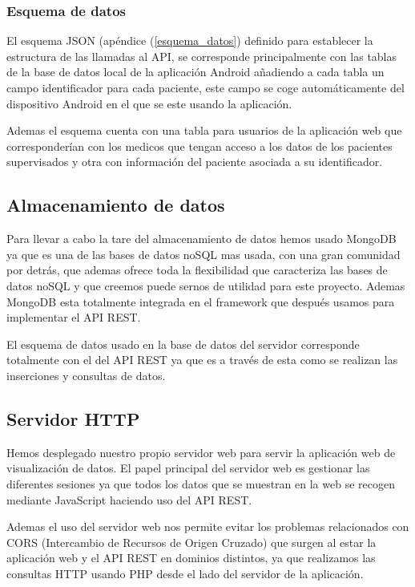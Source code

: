 \subsubsection{Esquema de datos}

El esquema JSON (apéndice (\ref{esquema_datos}) definido para establecer la estructura de las llamadas al API, se corresponde principalmente con las tablas de la base de datos local de la aplicación Android añadiendo a cada tabla un campo identificador para cada paciente, este campo se coge automáticamente del dispositivo Android en el que se este usando la aplicación.
\newline

Ademas el esquema cuenta con una tabla para usuarios de la aplicación web que corresponderían con los medicos que tengan acceso a los datos de los pacientes supervisados y otra con información del paciente asociada a su identificador.
\newline

\subsection{Almacenamiento de datos}
Para llevar a cabo la tare del almacenamiento de datos hemos usado MongoDB ya que es una de las bases de datos noSQL mas usada, con una gran comunidad por detrás, que ademas ofrece toda la flexibilidad que caracteriza las bases de datos noSQL y que creemos puede sernos de utilidad para este proyecto. Ademas MongoDB esta totalmente integrada en el framework que después usamos para implementar el API REST.

El esquema de datos usado en la base de datos del servidor corresponde totalmente con el del API REST ya que es a través de esta como se realizan las inserciones y consultas de datos.

\subsection{Servidor HTTP}
Hemos desplegado nuestro propio servidor web para servir la aplicación web de visualización de datos. El papel principal del servidor web es gestionar las diferentes sesiones ya que todos los datos que se muestran en la web se recogen mediante JavaScript haciendo uso del API REST. 
\newline

Ademas el uso del servidor web nos permite evitar los problemas relacionados con CORS (Intercambio de Recursos de Origen Cruzado) que surgen al estar la aplicación web y el API REST en dominios distintos, ya que realizamos las consultas HTTP usando PHP desde el lado del servidor de la aplicación.

